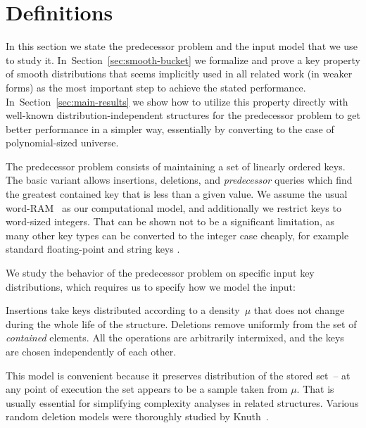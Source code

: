 
\section{Definitions \label{sec:defs}}

In this section we state the predecessor problem and the input model
that we use to study it. In~Section~\ref{sec:smooth-bucket} we
formalize and prove a key property of smooth distributions that seems
implicitly used in all related work (in weaker forms) as the most
important step to achieve the stated performance. In~Section~\ref{sec:main-results}
we show how to utilize this property directly with well-known distribution-independent
structures for the predecessor problem to get better performance in
a simpler way, essentially by converting to the case of polynomial-sized
universe.

The predecessor problem consists of maintaining a set of linearly
ordered keys. The basic variant allows insertions, deletions, and
\emph{predecessor} queries which find the greatest contained key that
is less than a given value. We assume the usual word-RAM~\cite{HagerupT98}
as our computational model, and additionally we restrict keys to word-sized
integers. That can be shown not to be a significant limitation, as
many other key types can be converted to the integer case cheaply,
for example standard floating-point \cite[sec. 2.1.3]{Goldberg91}
and string keys \cite{AndersT01}.

We study the behavior of the predecessor problem on specific input
key distributions, which requires us to specify how we model the input:
\begin{defn}
Insertions take keys distributed according to a density~$\mu$ that
does not change during the whole life of the structure. Deletions
remove uniformly from the set of \emph{contained} elements. All the
operations are arbitrarily intermixed, and the keys are chosen independently
of each other.
\end{defn}
This model is convenient because it preserves distribution of the
stored set~– at any point of execution the set appears to be a sample
taken from $\mu$. That is usually essential for simplifying complexity
analyses in related structures. Various random deletion models were
thoroughly studied by Knuth~\cite{Knuth77}.

